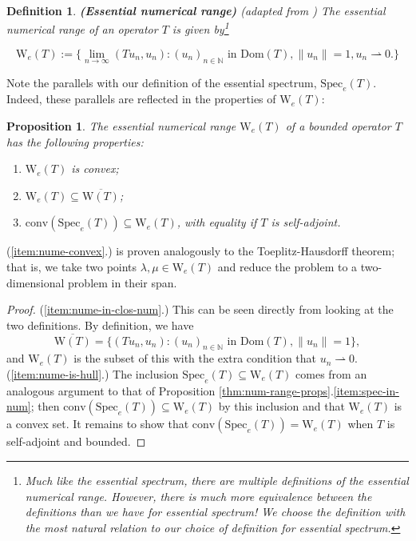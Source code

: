 \documentclass{article}
\newcommand{\Num}{\text{W}}
\newcommand{\Spec}{\text{Spec}}
\newcommand{\Dom}{\text{Dom}}
\newcommand{\conv}{\text{conv}}
\newtheorem{definition}{Definition}
\newtheorem{proposition}{Proposition}[section]
\begin{document}
\begin{definition}{\textbf{(Essential numerical range)}} (adapted from \cite{fillmore1972essential})
The essential numerical range of an operator $T$ is given by\footnote{Much like the essential spectrum, there are multiple definitions of the essential numerical range.
However, there is much more equivalence between the definitions than we have for essential spectrum! \cite{fillmore1972essential} We choose the definition with the most
natural relation to our choice of definition for essential spectrum.}

$$\Num_e (T) := \{\lim_{n \rightarrow \infty}( Tu_n, u_n ) : (u_n)_{n \in \mathbb{N}}\text{ in } \Dom(T), \|u_n\|=1, u_n \rightharpoonup 0.\}$$
\end{definition}
Note the parallels with our definition of the essential spectrum, $\Spec_e(T)$. Indeed, these parallels are reflected in the properties of $\Num_e(T)$:

\begin{proposition}\label{thm:nume-props} The essential numerical range $\Num_e(T)$ of a bounded operator $T$ has the following properties:
\begin{enumerate}
\item\label{item:nume-convex} $\Num_e(T)$ is convex;
\item\label{item:nume-in-clos-num} $\Num_e(T) \subseteq \overline{\Num(T)}$;
\item\label{item:nume-is-hull} $\conv(\Spec_e(T)) \subseteq \Num_e(T)$, with equality if $T$ is self-adjoint.
\end{enumerate}
\end{proposition}
(\ref{item:nume-convex}.) is proven analogously to the Toeplitz-Hausdorff theorem; that is, we take two points
$\lambda, \mu \in \Num_e(T)$ and reduce the problem to a two-dimensional problem in their span. \cite{bogli2020essential}

\begin{proof}
(\ref{item:nume-in-clos-num}.) This can be seen directly from looking at the two definitions. By definition, we have
$$\overline{\Num(T)} = \{( Tu_n, u_n ) : (u_n)_{n \in \mathbb{N}}\text{ in } \Dom(T), \|u_n\|=1\},$$ and $\Num_e(T)$ is the subset of this with the extra condition
that $u_n \rightharpoonup 0$.
\\
(\ref{item:nume-is-hull}.) The inclusion $\Spec_e(T) \subseteq \Num_e(T)$ comes from an analogous argument
to that of Proposition \ref{thm:num-range-props}.\ref{item:spec-in-num}; then $\conv(\Spec_e(T)) \subseteq \Num_e(T)$
by this inclusion and that $\Num_e(T)$ is a convex set. It remains to show that $\conv(\Spec_e(T)) = \Num_e(T)$ when $T$ is self-adjoint and bounded.
\end{proof}
\end{document}
